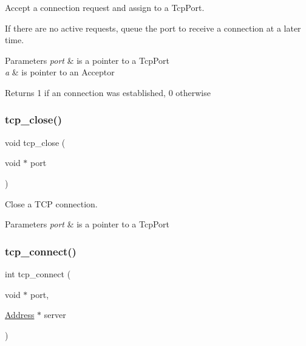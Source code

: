 Accept a connection request and assign to a Tcp\+Port. 

If there are no active requests, queue the port to receive a connection at a later time. 
\begin{DoxyParams}{Parameters}
{\em port} & is a pointer to a Tcp\+Port \\
\hline
{\em a} & is pointer to an Acceptor \\
\hline
\end{DoxyParams}
\begin{DoxyReturn}{Returns}
1 if an connection was established, 0 otherwise 
\end{DoxyReturn}
\mbox{\label{group__tcp_gad6e94cc6e0319629b8b1dd2cfab0ca48}} 
\subsubsection{\texorpdfstring{tcp\+\_\+close()}{tcp\_close()}}
{\footnotesize\ttfamily void tcp\+\_\+close (\begin{DoxyParamCaption}\item[{void $\ast$}]{port }\end{DoxyParamCaption})}



Close a T\+CP connection. 


\begin{DoxyParams}{Parameters}
{\em port} & is a pointer to a Tcp\+Port \\
\hline
\end{DoxyParams}
\mbox{\label{group__tcp_gaacf72af5cac869052f5562e9bf369bae}} 
\subsubsection{\texorpdfstring{tcp\+\_\+connect()}{tcp\_connect()}}
{\footnotesize\ttfamily int tcp\+\_\+connect (\begin{DoxyParamCaption}\item[{void $\ast$}]{port,  }\item[{\hyperlink{group__address_ga80f2dcdb3778441e85ac8c9dbb6f324a}{Address} $\ast$}]{server }\end{DoxyParamCaption})}



